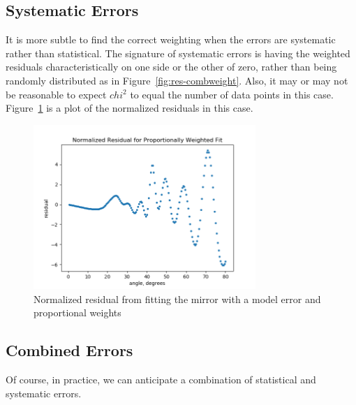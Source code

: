 \documentclass[english]{scrartcl}
\begin{document}
\subsection{Systematic Errors}
It is more subtle to find the correct weighting when
the errors are systematic rather than statistical. The
signature of systematic errors is having the weighted
residuals characteristically on one side or the other
of zero, rather than being randomly distributed as
in Figure~\ref{fig:res-combweight}. Also, it may or
may not be reasonable to expect $chi^2$ to equal the
number of data points in this case. Figure~\ref{fig:mrp} is
a plot of the normalized residuals in this case.
\begin{figure}[htb]
	\begin{center}
		\includegraphics[width=0.75\textwidth]{images/mrp}
	\end{center}
	\caption{\label{fig:mrp}Normalized residual from
	fitting the mirror with a model error and proportional
	weights}
\end{figure}

\subsection{Combined Errors}
Of course, in practice, we can anticipate a combination
of statistical and systematic errors.

\appendix
\end{document}

